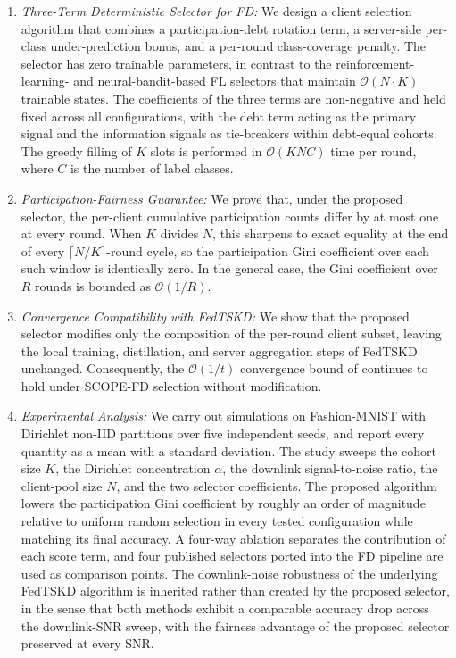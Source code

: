 \documentclass[journal]{IEEEtran}
\newcommand{\rev}[1]{#1}
\begin{document}
\begin{enumerate}
    \item \textit{Three-Term Deterministic Selector for FD:} We design a client selection algorithm that combines a participation-debt rotation term, a server-side per-class under-prediction bonus, and a per-round class-coverage penalty. The selector has zero trainable parameters, in contrast to the reinforcement-learning- and neural-bandit-based FL selectors that maintain $\mathcal{O}(N\cdot K)$ trainable states. The coefficients of the three terms are non-negative and held fixed across all configurations, with the debt term acting as the primary signal and the information signals as tie-breakers within debt-equal cohorts. The greedy filling of $K$ slots is performed in $\mathcal{O}(KNC)$ time per round, where $C$ is the number of label classes.

    \item \textit{Participation-Fairness Guarantee:} We prove that, under the proposed selector, the per-client cumulative participation counts differ by at most one at every round. When $K$ divides $N$, this sharpens to exact equality at the end of every $\lceil N/K \rceil$-round cycle, so the participation Gini coefficient over each such window is identically zero. In the general case, the Gini coefficient over $R$ rounds is bounded as $\mathcal{O}(1/R)$.

    \item \textit{Convergence Compatibility with FedTSKD:} We show that the proposed selector modifies only the composition of the per-round client subset, leaving the local training, distillation, and server aggregation steps of FedTSKD \cite{mu2024fedtskd} unchanged. Consequently, the $\mathcal{O}(1/t)$ convergence bound of \cite{mu2024fedtskd} continues to hold under SCOPE-FD selection without modification.

    \item \textit{Experimental Analysis:} \rev{We carry out simulations on Fashion-MNIST with Dirichlet non-IID partitions over five independent seeds, and report every quantity as a mean with a standard deviation. The study sweeps the cohort size $K$, the Dirichlet concentration $\alpha$, the downlink signal-to-noise ratio, the client-pool size $N$, and the two selector coefficients. The proposed algorithm lowers the participation Gini coefficient by roughly an order of magnitude relative to uniform random selection in every tested configuration while matching its final accuracy. A four-way ablation separates the contribution of each score term, and four published selectors ported into the FD pipeline are used as comparison points. The downlink-noise robustness of the underlying FedTSKD algorithm is inherited rather than created by the proposed selector, in the sense that both methods exhibit a comparable accuracy drop across the downlink-SNR sweep, with the fairness advantage of the proposed selector preserved at every SNR.}
\end{enumerate}
\end{document}
